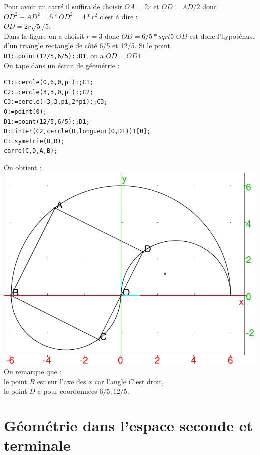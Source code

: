 \documentclass[a4paper,11pt]{book}
\begin{document}
Pour avoir un carr\'e il suffira de choisir $OA=2r$ et $OD=AD/2$ donc
$OD^2+AD^2=5*OD^2=4*r^2$ c'est \`a dire :\\
$OD=2r\sqrt5/5$.\\
Dans la figure on a choisit $r=3$ donc $OD=6/5*sqrt5$ $OD$ est donc 
l'hypot\'enuse d'un triangle rectangle de c\^ot\'e 6/5 et 12/5.
Si le point {\tt D1:=point(12/5,6/5):;D1}, on a $OD=OD1$.\\
On tape dans un \'ecran de g\'eom\'etrie :
\begin{verbatim}
C1:=cercle(0,6,0,pi):;C1;
C2:=cercle(3,3,0,pi):;C2;
C3:=cercle(-3,3,pi,2*pi):;C3;
O:=point(0);
D1:=point(12/5,6/5):;D1;
D:=inter(C2,cercle(O,longueur(O,D1)))[0];
C:=symetrie(O,D);
carre(C,D,A,B);
\end{verbatim}
On obtient :
\includegraphics[width=\textwidth]{gouttec}\\
On remarque que :\\
le point $B$ est sur l'axe des $x$ car l'angle $C$ est droit,\\
le point $D$ a pour coordonn\'ees $6/5,12/5$.

\chapter{G\'eom\'etrie dans l'espace seconde et terminale}
\end{document}

